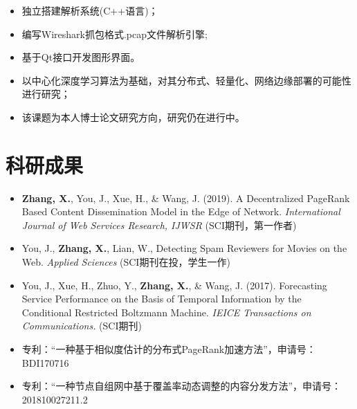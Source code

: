 \documentclass{resume}
\begin{document}
\begin{itemize}
  \item 独立搭建解析系统(C++语言)；
  \item 编写Wireshark抓包格式.pcap文件解析引擎;
  \item 基于Qt接口开发图形界面。
\end{itemize}

\begin{itemize}
  \item 以中心化深度学习算法为基础，对其分布式、轻量化、网络边缘部署的可能性进行研究；
  \item 该课题为本人博士论文研究方向，研究仍在进行中。
\end{itemize}




\section{科研成果}
\begin{itemize}[parsep=0.5ex]
  \item \textbf{Zhang, X.}, You, J., Xue, H., \& Wang, J. (2019). A Decentralized PageRank Based Content Dissemination Model in the Edge of Network. \textit{International Journal of Web Services Research, IJWSR} (SCI期刊，第一作者)
  \item You, J., \textbf{Zhang, X.}, Lian, W., Detecting Spam Reviewers for Movies on the Web. \textit{Applied Sciences} (SCI期刊在投，学生一作)
  \item You, J., Xue, H., Zhuo, Y., \textbf{Zhang, X.}, \& Wang, J. (2017). Forecasting Service Performance on the Basis of Temporal Information by the Conditional Restricted Boltzmann Machine. \textit{IEICE Transactions on Communications.} (SCI期刊)
  \item 专利：“一种基于相似度估计的分布式PageRank加速方法”，申请号：BDI170716
  \item 专利：“一种节点自组网中基于覆盖率动态调整的内容分发方法”，申请号：201810027211.2
\end{itemize}
\end{document}
